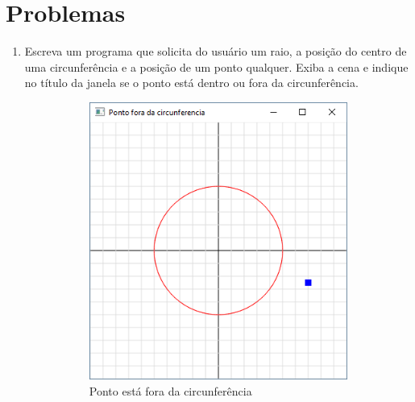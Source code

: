 \section*{Problemas}
\begin{enumerate}

\item
   Escreva um programa que solicita do usuário um raio, a posição do centro de uma circunferência e a posição de um ponto qualquer. Exiba a cena e indique no título da janela se o ponto está dentro ou fora da circunferência.

   \begin{figure}[!htb]
    \centering
    \begin{subfigure}[t]{0.4\textwidth}
        \centerline{\includegraphics[width=.9\textwidth]{img/cap1_ex22}}
        \caption{Ponto está fora da circunferência}
        \label{fig:cap01_ex22a}
    \end{subfigure}
    ~
    \begin{subfigure}[t]{0.4\textwidth}

\end{subfigure}
\end{figure}
\end{enumerate}
